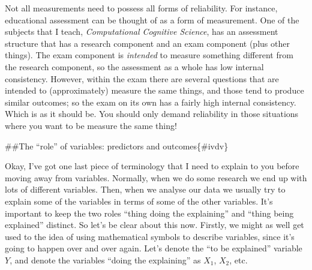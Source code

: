 \documentclass[]{book}
\begin{document}
Not all measurements need to possess all forms of reliability. For instance, educational assessment can be thought of as a form of measurement. One of the subjects that I teach, \emph{Computational Cognitive Science}, has an assessment structure that has a research component and an exam component (plus other things). The exam component is \emph{intended} to measure something different from the research component, so the assessment as a whole has low internal consistency. However, within the exam there are several questions that are intended to (approximately) measure the same things, and those tend to produce similar outcomes; so the exam on its own has a fairly high internal consistency. Which is as it should be. You should only demand reliability in those situations where you want to be measure the same thing!

\#\#The ``role'' of variables: predictors and outcomes\{\#ivdv\}

Okay, I've got one last piece of terminology that I need to explain to you before moving away from variables. Normally, when we do some research we end up with lots of different variables. Then, when we analyse our data we usually try to explain some of the variables in terms of some of the other variables. It's important to keep the two roles ``thing doing the explaining'' and ``thing being explained'' distinct. So let's be clear about this now. Firstly, we might as well get used to the idea of using mathematical symbols to describe variables, since it's going to happen over and over again. Let's denote the ``to be explained'' variable \(Y\), and denote the variables ``doing the explaining'' as \(X_1\), \(X_2\), etc.
\end{document}
